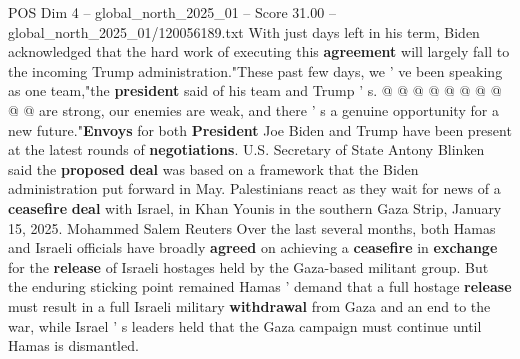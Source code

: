 \begin{textsample}{POS Dim 4 – global\_north\_2025\_01 – Score 31.00 – global\_north\_2025\_01/120056189.txt}
With just days left in his term, Biden acknowledged that the hard work of executing this \textbf{agreement} will largely fall to the incoming Trump administration."These past few days, we ' ve been speaking as one team,"the \textbf{president} said of his team and Trump ' s. @ @ @ @ @ @ @ @ @ @ are strong, our enemies are weak, and there ' s a genuine opportunity for a new future."\textbf{Envoys} for both \textbf{President} Joe Biden and Trump have been present at the latest rounds of \textbf{negotiations}.
U.S.
Secretary of State Antony Blinken said the \textbf{proposed} \textbf{deal} was based on a framework that the Biden administration put forward in May.
Palestinians react as they wait for news of a \textbf{ceasefire} \textbf{deal} with Israel, in Khan Younis in the southern Gaza Strip, January 15, 2025.
Mohammed Salem Reuters Over the last several months, both Hamas and Israeli officials have broadly \textbf{agreed} on achieving a \textbf{ceasefire} in \textbf{exchange} for the \textbf{release} of Israeli hostages held by the Gaza-based militant group.
But the enduring sticking point remained Hamas ' demand that a full hostage \textbf{release} must result in a full Israeli military \textbf{withdrawal} from Gaza and an end to the war, while Israel ' s leaders held that the Gaza campaign must continue until Hamas is dismantled.

\end{textsample}
